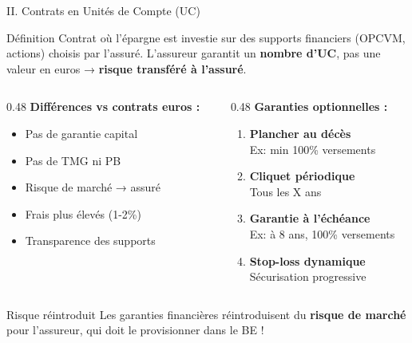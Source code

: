 \documentclass[10pt,aspectratio=169]{beamer}
\newcommand{\highlight}[1]{\textbf{\color{rougeactu}#1}}
\begin{document}
\begin{frame}{II. Contrats en Unités de Compte (UC)}
\begin{block}{Définition}
Contrat où l'épargne est investie sur des supports financiers (OPCVM, actions) choisis par l'assuré. L'assureur garantit un \highlight{nombre d'UC}, pas une valeur en euros → \textbf{risque transféré à l'assuré}.
\end{block}

\begin{columns}[T]
\begin{column}{0.48\textwidth}
\textbf{Différences vs contrats euros :}
\begin{itemize}
    \item \textcolor{rougeactu}{Pas de garantie capital}
    \item Pas de TMG ni PB
    \item Risque de marché → assuré
    \item Frais plus élevés (1-2\%)
    \item Transparence des supports
\end{itemize}
\end{column}
\begin{column}{0.48\textwidth}
\textbf{Garanties optionnelles :}
\begin{enumerate}
    \item \textbf{Plancher au décès}\\
    {\scriptsize Ex: min 100\% versements}
    \item \textbf{Cliquet périodique}\\
    {\scriptsize Tous les X ans}
    \item \textbf{Garantie à l'échéance}\\
    {\scriptsize Ex: à 8 ans, 100\% versements}
    \item \textbf{Stop-loss dynamique}\\
    {\scriptsize Sécurisation progressive}
\end{enumerate}
\end{column}
\end{columns}

\vspace{0.3cm}
\begin{alertblock}{Risque réintroduit}
Les garanties financières réintroduisent du \textbf{risque de marché} pour l'assureur, qui doit le provisionner dans le BE !
\end{alertblock}
\end{frame}
\end{document}
